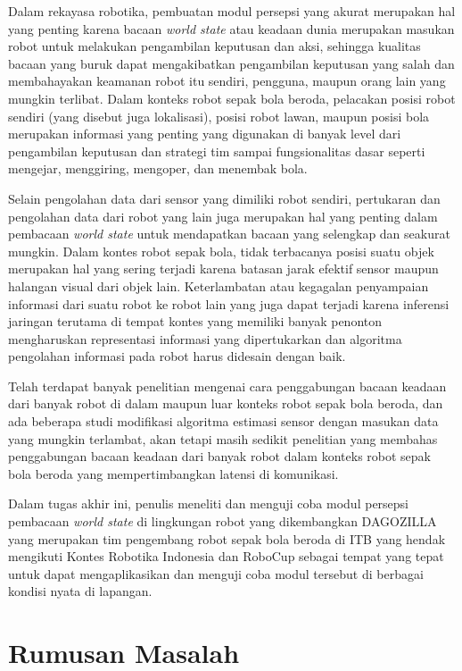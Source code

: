 Dalam rekayasa robotika, pembuatan modul persepsi yang akurat merupakan hal yang penting karena bacaan \textit{world state} atau keadaan dunia merupakan masukan robot untuk melakukan pengambilan keputusan dan aksi, sehingga kualitas bacaan yang buruk dapat mengakibatkan pengambilan keputusan yang salah dan membahayakan keamanan robot itu sendiri, pengguna, maupun orang lain yang mungkin terlibat. Dalam konteks robot sepak bola beroda, pelacakan posisi robot sendiri (yang disebut juga lokalisasi), posisi robot lawan, maupun posisi bola merupakan informasi yang penting yang digunakan di banyak level dari pengambilan keputusan dan strategi tim sampai fungsionalitas dasar seperti mengejar, menggiring, mengoper, dan menembak bola.

Selain pengolahan data dari sensor yang dimiliki robot sendiri, pertukaran dan pengolahan data dari robot yang lain juga merupakan hal yang penting dalam pembacaan \textit{world state} untuk mendapatkan bacaan yang selengkap dan seakurat mungkin. Dalam kontes robot sepak bola, tidak terbacanya posisi suatu objek merupakan hal yang sering terjadi karena batasan jarak efektif sensor maupun halangan visual dari objek lain. Keterlambatan atau kegagalan penyampaian informasi dari suatu robot ke robot lain yang juga dapat terjadi karena inferensi jaringan terutama di tempat kontes yang memiliki banyak penonton mengharuskan representasi informasi yang dipertukarkan dan algoritma pengolahan informasi pada robot harus didesain dengan baik.

Telah terdapat banyak penelitian mengenai cara penggabungan bacaan keadaan dari banyak robot di dalam maupun luar konteks robot sepak bola beroda, dan ada beberapa studi modifikasi algoritma estimasi sensor dengan masukan data yang mungkin terlambat, akan tetapi masih sedikit penelitian yang membahas penggabungan bacaan keadaan dari banyak robot dalam konteks robot sepak bola beroda yang mempertimbangkan latensi di komunikasi.

Dalam tugas akhir ini, penulis meneliti dan menguji coba modul persepsi pembacaan \textit{world state} di lingkungan robot yang dikembangkan DAGOZILLA yang merupakan tim pengembang robot sepak bola beroda di ITB yang hendak mengikuti Kontes Robotika Indonesia dan RoboCup sebagai tempat yang tepat untuk dapat mengaplikasikan dan menguji coba modul tersebut di berbagai kondisi nyata di lapangan.

\section{Rumusan Masalah}

